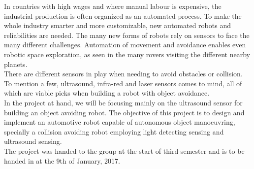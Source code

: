 In countries with high wages and where manual labour is expensive, the industrial production is often organized as an automated process. To make the whole industry smarter and more customizable, new automated robots and reliabilities are needed. The many new forms of robots rely on sensors to face the many different challenges.
Automation of movement and avoidance enables even robotic space exploration, as seen in the many rovers visiting the different nearby planets. \
 \\

There are different sensors in play when needing to avoid obstacles or collision. To mention a few, ultrasound, infra-red and laser sensors comes to mind, all of which are viable picks when building a robot with object avoidance.\\

In the project at hand, we will be focusing mainly on the ultrasound sensor for building an object avoiding robot. 
The objective of this project is to design and implement an automotive robot capable of autonomous object manoeuvring, specially a collision avoiding robot employing light detecting sensing and ultrasound sensing.\\

The project was handed to the group at the start of third semester and is to be handed in at the 9th of January, 2017.